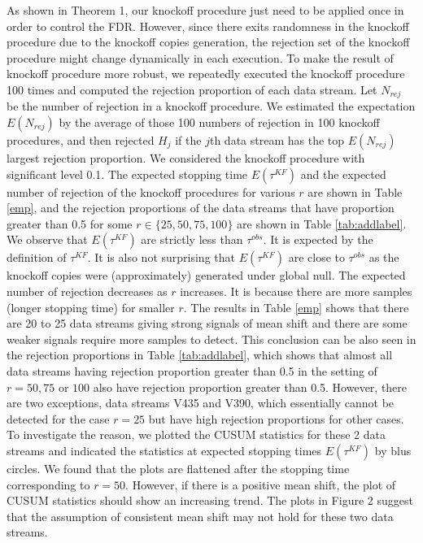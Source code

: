 \documentclass[a4paper,12pt]{article}
\begin{document}
As shown in Theorem 1, our knockoff procedure just need to be applied once in order to control the FDR. However, since there exits randomness in the knockoff procedure due to the knockoff copies generation, the rejection set of the knockoff procedure might change dynamically in each execution. To make the result of knockoff procedure more robust, we repeatedly executed the knockoff procedure 100 times and computed the rejection proportion of each data stream. Let $N_{rej}$ be the number of rejection in a knockoff procedure. We estimated the expectation $E(N_{rej})$ by the average of those 100 numbers of rejection in 100 knockoff procedures, and then rejected $H_j$ if the $j$th data stream has the top $E(N_{rej})$ largest rejection proportion. We considered the knockoff procedure with significant level 0.1. The expected stopping time $E(\tau^{KF})$ and the expected number of rejection of the knockoff procedures for various $r$ are shown in Table \ref{emp}, and the rejection proportions of the data streams that have proportion greater than 0.5 for some $r\in\{25,50,75,100\}$ are shown in Table \ref{tab:addlabel}. We observe that $E(\tau^{KF})$ are strictly less than $\tau^{obs}$. It is expected by the definition of $\tau^{KF}$. It is also not surprising that $E(\tau^{KF})$ are close to $\tau^{obs}$ as the knockoff copies were (approximately) generated under global null. The expected number of rejection decreases as $r$ increases. It is because there are more samples (longer stopping time) for smaller $r$. The results in Table \ref{emp} shows that there are 20 to 25 data streams giving strong signals of mean shift and there are some weaker signals require more samples to detect. This conclusion can be also seen in the rejection proportions in Table \ref{tab:addlabel}, which shows that almost all data streams having rejection proportion greater than 0.5 in the setting of $r=50,75$ or $100$ also have rejection proportion greater than 0.5. However, there are two exceptions, data streams V435 and V390, which essentially cannot be detected for the case $r=25$ but have high rejection proportions for other cases. To investigate the reason, we plotted the CUSUM statistics for these 2 data streams and indicated the statistics at expected stopping times $E(\tau^{KF})$ by blus circles. We found that the plots are flattened after the stopping time corresponding to $r=50$. However, if there is a positive mean shift, the plot of CUSUM statistics should show an increasing trend. The plots in Figure 2 suggest that the assumption of consistent mean shift may not hold for these two data streams.   
\end{document}
